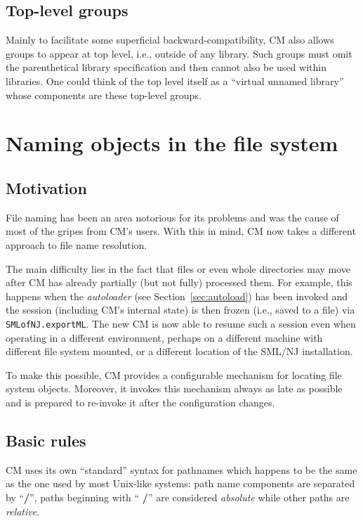 \documentclass{article}
\begin{document}
\subsection{Top-level groups}

Mainly to facilitate some superficial backward-compatibility, CM also
allows groups to appear at top level, i.e., outside of any library.
Such groups must omit the parenthetical library specification and then
cannot also be used within libraries. One could think of the top level
itself as a ``virtual unnamed library'' whose components are these
top-level groups.

\section{Naming objects in the file system}

\subsection{Motivation}

File naming has been an area notorious for its problems and was the
cause of most of the gripes from CM's users.  With this in mind, CM
now takes a different approach to file name resolution.

The main difficulty lies in the fact that files or even whole
directories may move after CM has already partially (but not fully)
processed them.  For example, this happens when the {\em autoloader}
(see Section~\ref{sec:autoload}) has been invoked and the session
(including CM's internal state) is then frozen (i.e., saved to a file)
via {\tt SMLofNJ.exportML}.  The new CM is now able to resume such a
session even when operating in a different environment, perhaps on a
different machine with different file system mounted, or a different
location of the SML/NJ installation.

To make this possible, CM provides a configurable mechanism for
locating file system objects.  Moreover, it invokes this mechanism
always as late as possible and is prepared to re-invoke it after the
configuration changes.

\subsection{Basic rules}

CM uses its own ``standard'' syntax for pathnames which happens to be
the same as the one used by most Unix-like systems: path name
components are separated by ``{\bf /}'', paths beginning with ``{\bf
/}'' are considered {\em absolute} while other paths are {\em
relative}.
\end{document}

